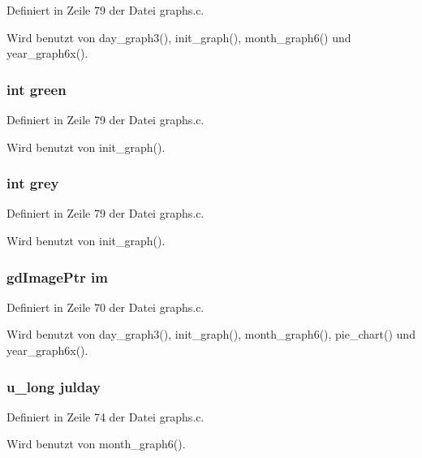 Definiert in Zeile 79 der Datei graphs.c.

Wird benutzt von day\_\-graph3(), init\_\-graph(), month\_\-graph6() und year\_\-graph6x().
\subsubsection{\setlength{\rightskip}{0pt plus 5cm}int {\bf green}}\label{graphs_8c_6e208843f894f38fa7644608917a2a41}




Definiert in Zeile 79 der Datei graphs.c.

Wird benutzt von init\_\-graph().
\subsubsection{\setlength{\rightskip}{0pt plus 5cm}int {\bf grey}}\label{graphs_8c_852d2c8c77477e510b44d799fdaaf1f9}




Definiert in Zeile 79 der Datei graphs.c.

Wird benutzt von init\_\-graph().
\subsubsection{\setlength{\rightskip}{0pt plus 5cm}gd\-Image\-Ptr {\bf im}}\label{graphs_8c_0e84b6d886b70b0cf21c56e5e26f0ed9}




Definiert in Zeile 70 der Datei graphs.c.

Wird benutzt von day\_\-graph3(), init\_\-graph(), month\_\-graph6(), pie\_\-chart() und year\_\-graph6x().
\subsubsection{\setlength{\rightskip}{0pt plus 5cm}u\_\-long {\bf julday}}\label{graphs_8c_488cb40243821792a9a226ca1042b3e1}




Definiert in Zeile 74 der Datei graphs.c.

Wird benutzt von month\_\-graph6().
